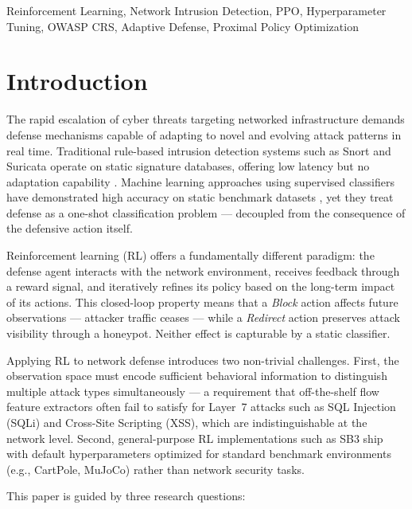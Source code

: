 \documentclass[conference]{IEEEtran}
\begin{document}
\begin{IEEEkeywords}
Reinforcement Learning, Network Intrusion Detection, PPO, Hyperparameter
Tuning, OWASP CRS, Adaptive Defense, Proximal Policy Optimization
\end{IEEEkeywords}

\section{Introduction}

The rapid escalation of cyber threats targeting networked infrastructure
demands defense mechanisms capable of adapting to novel and evolving attack
patterns in real time. Traditional rule-based intrusion detection systems
such as Snort and Suricata operate on static signature databases, offering
low latency but no adaptation capability \cite{ring2019survey}. Machine
learning approaches using supervised classifiers have demonstrated high
accuracy on static benchmark datasets \cite{sharafaldin2018cicids}, yet
they treat defense as a one-shot classification problem --- decoupled from
the consequence of the defensive action itself.

Reinforcement learning (RL) offers a fundamentally different paradigm: the
defense agent interacts with the network environment, receives feedback
through a reward signal, and iteratively refines its policy based on the
long-term impact of its actions. This closed-loop property means that a
\textit{Block} action affects future observations --- attacker traffic
ceases --- while a \textit{Redirect} action preserves attack visibility
through a honeypot. Neither effect is capturable by a static classifier.

Applying RL to network defense introduces two non-trivial challenges.
First, the observation space must encode sufficient behavioral information
to distinguish multiple attack types simultaneously --- a requirement that
off-the-shelf flow feature extractors often fail to satisfy for Layer~7
attacks such as SQL Injection (SQLi) and Cross-Site Scripting (XSS), which
are indistinguishable at the network level. Second, general-purpose RL
implementations such as SB3 ship with default hyperparameters optimized for
standard benchmark environments (e.g., CartPole, MuJoCo) rather than
network security tasks.

This paper is guided by three research questions:
\end{document}
